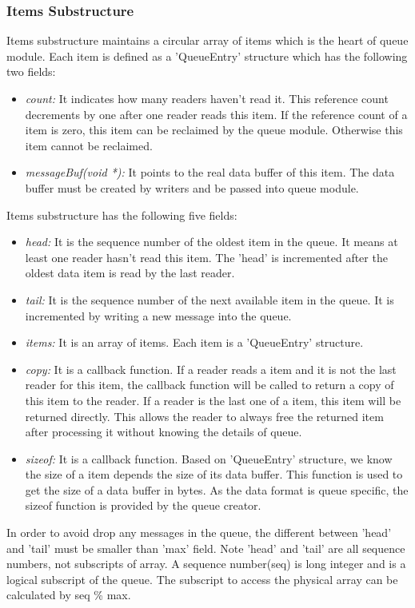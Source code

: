 \subsubsection{\label{sub:queue:struct:items}{Items Substructure}}
Items substructure maintains a circular array of items which is the heart of queue module. 
Each item is defined as a 'QueueEntry' structure which has the following two fields:
\begin{itemize}
	\item{\emph{count:} It indicates how many readers haven't read it.   This reference count decrements by one after one reader reads this item. If the reference count of a item is zero, this item can be reclaimed by the queue module. Otherwise this item cannot be reclaimed.}
	\item{\emph{messageBuf(void *):} It points to the real data buffer of this item. The data buffer must be created by writers and be passed into queue module.}
\end{itemize}
Items substructure has the following five fields:
\begin{itemize}
	  \item{\emph{head:} It is the sequence number of the oldest item in the queue. It means at least one reader hasn't read this item. The 'head' is incremented after the oldest data item is read by the last reader. }
	  \item{\emph{tail:} It is the sequence number of the next available item in the queue. It is incremented by writing a new message into the queue. }
	  \item{\emph{items:} It is an array of items. Each item is a 'QueueEntry' structure.}
	  \item{\emph{ copy:} It is a callback function. If a reader reads a item and it is not the last reader for this item, the callback function will be called to return a copy of this item to the reader. If a reader is the last one of a item, this item will be returned directly. This allows the reader to always free the returned item after processing it without knowing the details of queue. }
	  \item{\emph{ sizeof:} It is a callback function. Based on 'QueueEntry' structure, we know the size of a item depends the size of its data buffer. This function is used to get the size of a data buffer in bytes. As the data format is queue specific, the sizeof function is provided by the queue creator.}
\end{itemize}
In order to avoid drop any messages in the queue, the different between 'head' and 'tail' must be smaller than 'max' field. Note 'head' and 'tail' are all sequence numbers, not subscripts of array. A sequence number(seq) is long integer and is a logical subscript of the queue. The subscript to access the physical array can be calculated by seq \% max.
